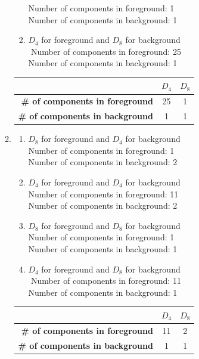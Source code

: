 \documentclass{article}
\newcommand{\forceindent}{\leavevmode{\parindent=2em\indent}}
\begin{document}
\begin{enumerate}[label=A\arabic*)]
\begin{enumerate}[label=(\alph*)]
\begin{enumerate}[label=\arabic*)]
						\forceindent Number of components in foreground: 1 \\
						\forceindent Number of components in background: 1
					\item $D_4$ for foreground and $D_8$ for background \\ \forceindent Number of components in foreground: 25 \\
						\forceindent Number of components in background: 1
				\end{enumerate}
				\begin{tabular}{ | r | c | c |}
					\hline
					 & $D_4$ & $D_8$ \\
					\hline
					\textbf{\# of components in foreground} & 25 & 1 \\
					\textbf{\# of components in background} & 1 & 1 \\
					\hline
				\end{tabular}
			\item
				\begin{enumerate}[label=\arabic*)]
					\item $D_8$ for foreground and $D_4$ for background \\
						\forceindent Number of components in foreground: 1 \\
						\forceindent Number of components in background: 2
					\item $D_4$ for foreground and $D_4$ for background \\
						\forceindent Number of components in foreground: 11 \\
						\forceindent Number of components in background: 2
					\item $D_8$ for foreground and $D_8$ for background \\
						\forceindent Number of components in foreground: 1 \\
						\forceindent Number of components in background: 1
					\item $D_4$ for foreground and $D_8$ for background \\ \forceindent Number of components in foreground: 11 \\
						\forceindent Number of components in background: 1
				\end{enumerate}
				\begin{tabular}{ | r | c | c |}
					\hline
					 & $D_4$ & $D_8$ \\
					\hline
					\textbf{\# of components in foreground} & 11 & 2 \\
					\textbf{\# of components in background} & 1 & 1 \\

\end{tabular}
\end{enumerate}
\end{enumerate}
\end{document}
